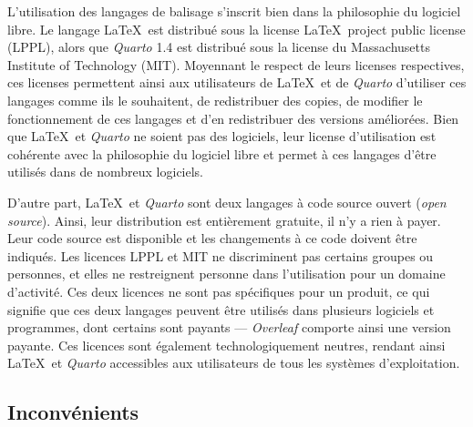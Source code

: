 \documentclass[
  letterpaper,
  DIV=11,
  numbers=noendperiod,
  oneside]{scrreprt}
\begin{document}
L'utilisation des langages de balisage s'inscrit bien dans la
philosophie du logiciel libre. Le langage \LaTeX{}~est distribué sous la
license \LaTeX{}~project public license (LPPL), alors que \emph{Quarto}
1.4 est distribué sous la license du Massachusetts Institute of
Technology (MIT). Moyennant le respect de leurs licenses respectives,
ces licenses permettent ainsi aux utilisateurs de \LaTeX{}~et de
\emph{Quarto} d'utiliser ces langages comme ils le souhaitent, de
redistribuer des copies, de modifier le fonctionnement de ces langages
et d'en redistribuer des versions améliorées. Bien que \LaTeX{}~et
\emph{Quarto} ne soient pas des logiciels, leur license d'utilisation
est cohérente avec la philosophie du logiciel libre et permet à ces
langages d'être utilisés dans de nombreux logiciels.

D'autre part, \LaTeX{}~et \emph{Quarto} sont deux langages à code source
ouvert (\emph{open source}). Ainsi, leur distribution est entièrement
gratuite, il n'y a rien à payer. Leur code source est disponible et les
changements à ce code doivent être indiqués. Les licences LPPL et MIT ne
discriminent pas certains groupes ou personnes, et elles ne restreignent
personne dans l'utilisation pour un domaine d'activité. Ces deux
licences ne sont pas spécifiques pour un produit, ce qui signifie que
ces deux langages peuvent être utilisés dans plusieurs logiciels et
programmes, dont certains sont payants --- \emph{Overleaf} comporte
ainsi une version payante. Ces licences sont également technologiquement
neutres, rendant ainsi \LaTeX{}~et \emph{Quarto} accessibles aux
utilisateurs de tous les systèmes d'exploitation.

\hypertarget{inconvuxe9nients}{%
\subsection{Inconvénients}\label{inconvuxe9nients}}
\end{document}
